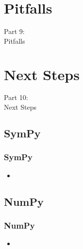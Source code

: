 
\section{Pitfalls}
\begin{frame}
    \vspace{25mm}
    \begin{center}
        \Huge{Part 9:\\Pitfalls}
    \end{center}
\end{frame}


\section{Next Steps}
\begin{frame}
    \vspace{25mm}
    \begin{center}
        \Huge{Part 10:\\Next Steps}
    \end{center}
\end{frame}

\subsection{SymPy}
\begin{frame}
    \frametitle{SymPy}
    \vspace{5mm}
    
    \begin{itemize}
      \item 
    \end{itemize}
\end{frame}

\subsection{NumPy}
\begin{frame}
    \frametitle{NumPy}
    \vspace{5mm}
    
    \begin{itemize}
      \item 
    \end{itemize}
\end{frame}

